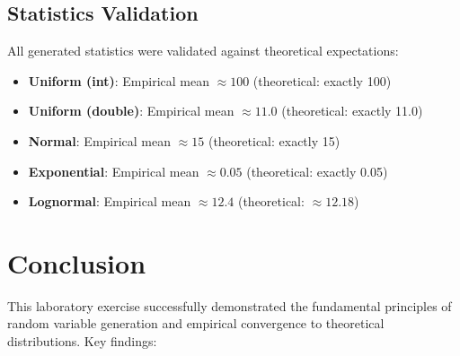 \documentclass[12pt]{article}
\begin{document}
\subsection{Statistics Validation}

All generated statistics were validated against theoretical expectations:
\begin{itemize}
    \item \textbf{Uniform (int)}: Empirical mean $\approx 100$ (theoretical: exactly 100)
    \item \textbf{Uniform (double)}: Empirical mean $\approx 11.0$ (theoretical: exactly 11.0)
    \item \textbf{Normal}: Empirical mean $\approx 15$ (theoretical: exactly 15)
    \item \textbf{Exponential}: Empirical mean $\approx 0.05$ (theoretical: exactly 0.05)
    \item \textbf{Lognormal}: Empirical mean $\approx 12.4$ (theoretical: $\approx 12.18$)
\end{itemize}

\section{Conclusion}

This laboratory exercise successfully demonstrated the fundamental principles of random variable generation and empirical convergence to theoretical distributions. Key findings:
\end{document}
